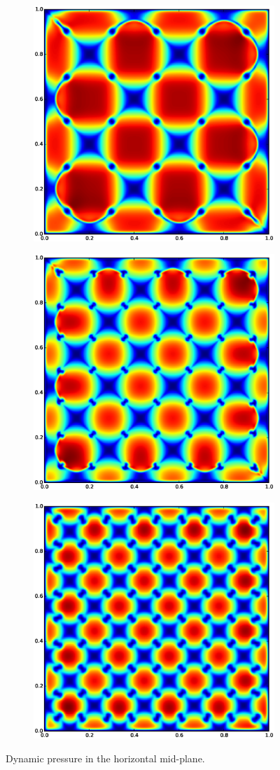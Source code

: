 \begin{figure}
\begin{subfigure}[b]{0.66\columnwidth}
  \includegraphics[width=0.66\columnwidth]{figs/dynamic_pressure-25-10}
\end{subfigure}
\begin{subfigure}[b]{0.66\columnwidth}
  \includegraphics[width=0.66\columnwidth]{figs/dynamic_pressure-35-10}
\end{subfigure}
\begin{subfigure}[b]{0.66\columnwidth}
  \includegraphics[width=0.66\columnwidth]{figs/dynamic_pressure-45-10}
\end{subfigure}
\caption{ 
Dynamic pressure in the horizontal mid-plane.
}
\end{figure}


